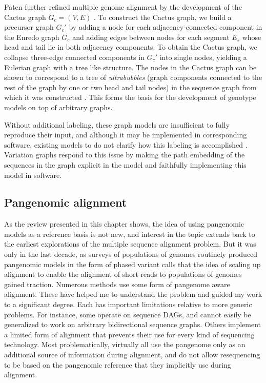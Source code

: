 Paten further refined multiple genome alignment by the development of the Cactus graph $G_c = (V,E)$ \cite{paten2011cactus}.
To construct the Cactus graph, we build a precursor graph $G_c'$ by adding a node for each adjacency-connected component in the Enredo graph $G_e$ and adding edges between nodes for each segment $E_s$ whose head and tail lie in both adjacency components.
To obtain the Cactus graph, we collapse three-edge connected components in $G_c'$ into single nodes, yielding a Eulerian graph with a tree like structure.
The nodes in the Cactus graph can be shown to correspond to a tree of \emph{ultrabubbles} (graph components connected to the rest of the graph by one or two head and tail nodes) in the sequence graph from which it was constructed \cite{paten2016superbubbles}.
This forms the basis for the development of genotype models on top of arbitrary graphs.

Without additional labeling, these graph models are insufficient to fully reproduce their input, and although it may be implemented in corresponding software, existing models to do not clarify how this labeling is accomplished \cite{kehr2014genome}.
Variation graphs respond to this issue by making the path embedding of the sequences in the graph explicit in the model and faithfully implementing this model in software.

\subsection{Pangenomic alignment}

As the review presented in this chapter shows, the idea of using pangenomic models as a reference basis is not new, and interest in the topic extends back to the earliest explorations of the multiple sequence alignment problem.
But it was only in the last decade, as surveys of populations of genomes routinely produced pangenomic models in the form of phased variant calls \cite{litisgrp,weigel20091001,cao2011whole,1000Gphase1,1000g2015} that the idea of scaling up alignment to enable the alignment of short reads to populations of genomes gained traction.
Numerous methods use some form of pangenome aware alignment.
These have helped me to understand the problem and guided my work to a significant degree.
Each has important limitations relative to more generic problems.
For instance, some operate on sequence DAGs, and cannot easily be generalized to work on arbitrary bidirectional sequence graphs.
Others implement a limited form of alignment that prevents their use for every kind of sequencing technology.
Most problematically, virtually all use the pangenome only as an additional source of information during alignment, and do not allow resequencing to be based on the pangenomic reference that they implicitly use during alignment.


